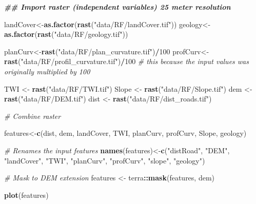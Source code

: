 \documentclass[
]{article}
\newenvironment{Shaded}{\begin{snugshade}}{\end{snugshade}}
\newcommand{\CommentTok}[1]{\textcolor[rgb]{0.56,0.35,0.01}{\textit{#1}}}
\newcommand{\DecValTok}[1]{\textcolor[rgb]{0.00,0.00,0.81}{#1}}
\newcommand{\DocumentationTok}[1]{\textcolor[rgb]{0.56,0.35,0.01}{\textbf{\textit{#1}}}}
\newcommand{\FunctionTok}[1]{\textcolor[rgb]{0.13,0.29,0.53}{\textbf{#1}}}
\newcommand{\NormalTok}[1]{#1}
\newcommand{\OtherTok}[1]{\textcolor[rgb]{0.56,0.35,0.01}{#1}}
\newcommand{\SpecialCharTok}[1]{\textcolor[rgb]{0.81,0.36,0.00}{\textbf{#1}}}
\newcommand{\StringTok}[1]{\textcolor[rgb]{0.31,0.60,0.02}{#1}}
\begin{document}
\begin{Shaded}
\begin{Highlighting}[]
\DocumentationTok{\#\# Import raster (independent variables) 25 meter resolution}

\NormalTok{landCover}\OtherTok{\textless{}{-}}\FunctionTok{as.factor}\NormalTok{(}\FunctionTok{rast}\NormalTok{(}\StringTok{"data/RF/landCover.tif"}\NormalTok{))}
\NormalTok{geology}\OtherTok{\textless{}{-}}\FunctionTok{as.factor}\NormalTok{(}\FunctionTok{rast}\NormalTok{(}\StringTok{"data/RF/geology.tif"}\NormalTok{))}

\NormalTok{planCurv}\OtherTok{\textless{}{-}}\FunctionTok{rast}\NormalTok{(}\StringTok{"data/RF/plan\_curvature.tif"}\NormalTok{)}\SpecialCharTok{/}\DecValTok{100}
\NormalTok{profCurv}\OtherTok{\textless{}{-}}\FunctionTok{rast}\NormalTok{(}\StringTok{"data/RF/profil\_curvature.tif"}\NormalTok{)}\SpecialCharTok{/}\DecValTok{100} 
\CommentTok{\# this because the input values was originally multiplied by 100}

\NormalTok{TWI }\OtherTok{\textless{}{-}} \FunctionTok{rast}\NormalTok{(}\StringTok{"data/RF/TWI.tif"}\NormalTok{)}
\NormalTok{Slope }\OtherTok{\textless{}{-}} \FunctionTok{rast}\NormalTok{(}\StringTok{"data/RF/Slope.tif"}\NormalTok{)}
\NormalTok{dem }\OtherTok{\textless{}{-}} \FunctionTok{rast}\NormalTok{(}\StringTok{"data/RF/DEM.tif"}\NormalTok{)}
\NormalTok{dist }\OtherTok{\textless{}{-}} \FunctionTok{rast}\NormalTok{(}\StringTok{"data/RF/dist\_roads.tif"}\NormalTok{)}

\CommentTok{\# Combine raster}

\NormalTok{features}\OtherTok{\textless{}{-}}\FunctionTok{c}\NormalTok{(dist, dem, landCover, TWI, planCurv, profCurv, Slope, geology)}

\CommentTok{\# Renames the input features }
\FunctionTok{names}\NormalTok{(features)}\OtherTok{\textless{}{-}}\FunctionTok{c}\NormalTok{(}\StringTok{"distRoad"}\NormalTok{, }\StringTok{"DEM"}\NormalTok{, }\StringTok{"landCover"}\NormalTok{, }\StringTok{"TWI"}\NormalTok{, }\StringTok{"planCurv"}\NormalTok{, }\StringTok{"profCurv"}\NormalTok{, }\StringTok{"slope"}\NormalTok{, }\StringTok{"geology"}\NormalTok{)}

\CommentTok{\# Mask to DEM extension}
\NormalTok{features }\OtherTok{\textless{}{-}}\NormalTok{ terra}\SpecialCharTok{::}\FunctionTok{mask}\NormalTok{(features, dem)}

\FunctionTok{plot}\NormalTok{(features)}
\end{Highlighting}
\end{Shaded}
\end{document}
